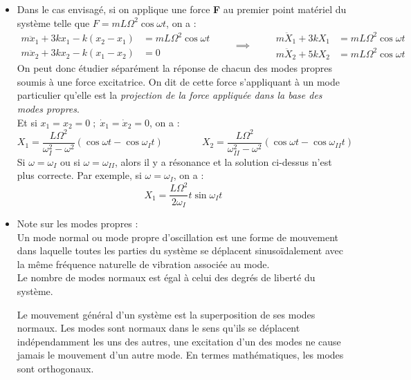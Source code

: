 \documentclass[a4paper]{article}
\begin{document}
\begin{itemize}
\item Dans le cas envisagé, si on applique une force \textbf{F} au premier point matériel du système telle que $ F = m L \Omega^2 \cos \omega t $, on a : 
\[ \begin{aligned} m \ddot{x}_1 + 3 k x_1 - k (x_2 - x_1) &= m L \Omega^2 \cos \omega t \\ m \ddot{x}_2 + 3 k x_2 - k (x_1 - x_2) &= 0 \end{aligned} \qquad \implies \qquad 
\begin{aligned} m \ddot{X}_1 + 3 k X_1 &= m L \Omega^2 \cos \omega t \\ m \ddot{X}_2 + 5 k X_2 &= m L \Omega^2 \cos \omega t \end{aligned} \]
On peut donc étudier séparément la réponse de chacun des modes propres soumis à une force excitatrice. On dit de cette force s'appliquant à un mode particulier qu'elle est la \emph{projection de la force appliquée dans la base des modes propres}. \\
Et si $ x_1 = x_2 = 0 \; ; \; \dot{x}_1 = \dot{x}_2 = 0 $, on a : 
\[ X_1 = \frac{L \Omega^2}{\omega_I^2 - \omega^2} (\cos \omega t - \cos \omega_I t) \qquad \qquad X_2 = \frac{L \Omega^2}{\omega_{II}^2 - \omega^2} (\cos \omega t - \cos \omega_{II} t) \]
Si $ \omega = \omega_I $ ou si $ \omega = \omega_{II} $, alors il y a résonance et la solution ci-dessus n'est plus correcte. Par exemple, si $ \omega = \omega_I $, on a : 
\[ X_1 = \frac{L \Omega^2}{2 \omega_I} t \sin \omega_I t \]





\item Note sur les modes propres : \\
Un mode normal ou mode propre d'oscillation est une forme de mouvement dans laquelle toutes les parties du système se déplacent sinusoïdalement avec la même fréquence naturelle de vibration associée au mode. \\
Le nombre de modes normaux est égal à celui des degrés de liberté du système.

Le mouvement général d'un système est la superposition de ses modes normaux. Les modes sont normaux dans le sens qu'ils se déplacent indépendamment les uns des autres, une excitation d'un des modes ne cause jamais le mouvement d'un autre mode. En termes mathématiques, les modes sont orthogonaux.






\end{itemize}
\end{document}
